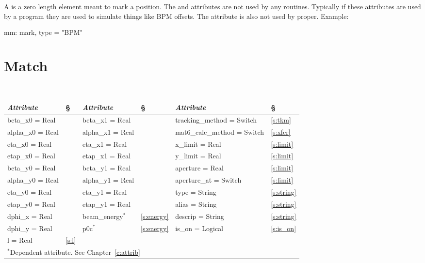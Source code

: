 {{
A  is a zero length element meant to mark a position. The
 and  attributes are not used by any \bmad
routines. Typically if these attributes are used by a program they are
used to simulate things like BPM offsets. The  attribute is
also not used by \bmad proper. Example:
\begin{example}
  mm: mark, type = "BPM"
\end{example}

\section{Match}
\label{s:match}

\begin{center}
\tt
\begin{tabular}{|l|l||l|l||l|l|} \hline
  {\sl Attribute} & \S  & {\sl Attribute} & \S & {\sl Attribute} & \S \\ \hline
  beta\_x0  = Real &               & beta\_x1  = Real &                & tracking\_method = Switch   & \ref{s:tkm}    \\ \hline
  alpha\_x0 = Real &               & alpha\_x1 = Real &                & mat6\_calc\_method = Switch & \ref{s:xfer}   \\ \hline
  eta\_x0   = Real &               & eta\_x1   = Real &                & x\_limit = Real             & \ref{s:limit}  \\ \hline
  etap\_x0  = Real &               & etap\_x1  = Real &                & y\_limit = Real             & \ref{s:limit}  \\ \hline
  beta\_y0  = Real &               & beta\_y1  = Real &                & aperture = Real             & \ref{s:limit}  \\ \hline
  alpha\_y0 = Real &               & alpha\_y1 = Real &                & aperture\_at = Switch       & \ref{s:limit}  \\ \hline
  eta\_y0   = Real &               & eta\_y1   = Real &                & type = String               & \ref{s:string} \\ \hline
  etap\_y0  = Real &               & etap\_y1  = Real &                & alias = String              & \ref{s:string} \\ \hline
  dphi\_x   = Real &               & beam\_energy$^*$ & \ref{s:energy} & descrip = String            & \ref{s:string} \\ \hline
  dphi\_y   = Real &               & p0c$^*$          & \ref{s:energy} & is\_on = Logical            & \ref{s:is_on}  \\ \hline
  l         = Real & \ref{s:l}     &                  &                &                             &                \\ \hline
  \multicolumn{6}{l}{\small $^*$Dependent attribute. See Chapter~\ref{c:attrib}} \\
\end{tabular}
\end{center}
\toffset

}}
